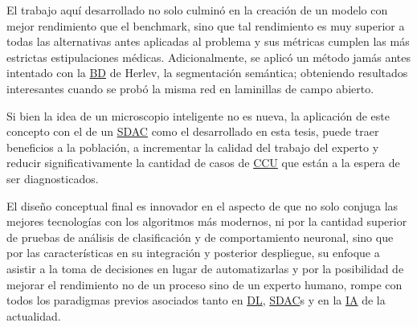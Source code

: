 El trabajo aquí desarrollado no solo culminó en la creación de un modelo con
mejor rendimiento que el benchmark, sino que tal rendimiento es muy superior a
todas las alternativas antes aplicadas al problema y sus métricas cumplen las
más estrictas estipulaciones médicas. Adicionalmente, se aplicó un método jamás
antes intentado con la \hyperlink{abbr}{BD} de Herlev, la segmentación
semántica; obteniendo resultados interesantes cuando se probó la misma red en
laminillas de campo abierto. 

Si bien la idea de un microscopio inteligente no es nueva, la aplicación de este
concepto con el de un \hyperlink{abbr}{SDAC} como el desarrollado en esta tesis,
puede traer beneficios a la población, a incrementar la calidad del trabajo del
experto y reducir significativamente la cantidad de casos de
\hyperlink{abbr}{CCU} que están a la espera de ser diagnosticados.

El diseño conceptual final es innovador en el aspecto de que no solo conjuga las
mejores tecnologías con los algoritmos más modernos, ni por la cantidad superior
de pruebas de análisis de clasificación y de comportamiento neuronal, sino que
por las características en su integración y posterior despliegue, su enfoque a
asistir a la toma de decisiones en lugar de automatizarlas y por la posibilidad
de mejorar el rendimiento no de un proceso sino de un experto humano, rompe con
todos los paradigmas previos asociados tanto en \hyperlink{abbr}{DL},
\hyperlink{abbr}{SDAC}s y en la \hyperlink{abbr}{IA} de la actualidad.